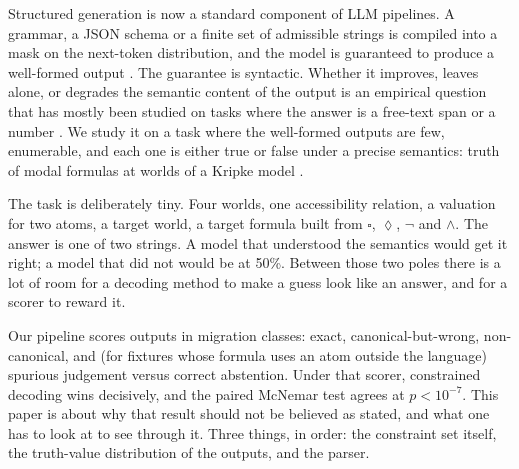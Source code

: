 \documentclass[11pt]{article}
\renewcommand{\Box}{\square}
\newcommand{\Dia}{\lozenge}
\begin{document}
Structured generation is now a standard component of LLM pipelines. A grammar, a JSON schema or a finite set of admissible strings is compiled into a mask on the next-token distribution, and the model is guaranteed to produce a well-formed output \citep{willard2023outlines,geng2023grammar}. The guarantee is syntactic. Whether it improves, leaves alone, or degrades the semantic content of the output is an empirical question that has mostly been studied on tasks where the answer is a free-text span or a number \citep{tam2024speak}. We study it on a task where the well-formed outputs are few, enumerable, and each one is either true or false under a precise semantics: truth of modal formulas at worlds of a Kripke model \citep{kripke1963,blackburn2001modal}.

The task is deliberately tiny. Four worlds, one accessibility relation, a valuation for two atoms, a target world, a target formula built from $\Box$, $\Dia$, $\neg$ and $\wedge$. The answer is one of two strings. A model that understood the semantics would get it right; a model that did not would be at 50\%. Between those two poles there is a lot of room for a decoding method to make a guess look like an answer, and for a scorer to reward it.

Our pipeline scores outputs in migration classes: exact, canonical-but-wrong, non-canonical, and (for fixtures whose formula uses an atom outside the language) spurious judgement versus correct abstention. Under that scorer, constrained decoding wins decisively, and the paired McNemar test agrees at $p<10^{-7}$. This paper is about why that result should not be believed as stated, and what one has to look at to see through it. Three things, in order: the constraint set itself, the truth-value distribution of the outputs, and the parser.
\end{document}
